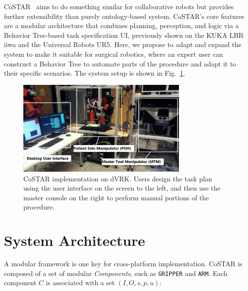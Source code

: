 \documentclass[letterpaper, 10 pt, conference]{ieeeconf}
\begin{document}


CoSTAR~\cite{paxton2017costar} aims to do something similar for collaborative robots but provides further extensibility than purely ontology-based system. 
CoSTAR's core features are a modular architecture that combines planning, perception, and logic via a Behavior Tree-based task specification UI, previously shown on the KUKA LBR iiwa and the Universal Robots UR5. Here, we propose to adapt and expand the system to make it suitable for surgical robotics, where an expert user can construct a Behavior Tree to automate parts of the procedure and adapt it to their specific scenarios.
The system setup is shown in Fig.~\ref{fig:dvrk}. 

\begin{figure}[bt]
\centering
\includegraphics[width=240pt]{dvrk.png}
\caption{CoSTAR implementation on dVRK. Users design the task plan using the user interface on the screen to the left, and then use the master console on the right to perform manual portions of the procedure.}
\label{fig:dvrk}
\end{figure}


\section{System Architecture}
A modular framework is one key for cross-platform implementation. CoSTAR is composed of a set of modular \textit{Components}, such as \texttt{GRIPPER} and \texttt{ARM}. Each component $C$ is associated with a set $(I,O,s,p,u)$: 
\end{document}
